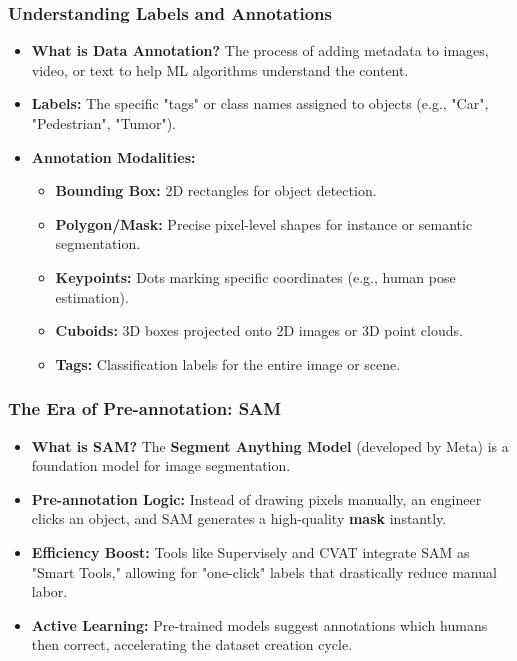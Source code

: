 \documentclass[aspectratio=169]{beamer}
\begin{document}
\begin{frame}[t]
    \frametitle{Understanding Labels and Annotations}
    \begin{itemize}
        \item \textbf{What is Data Annotation?} The process of adding metadata to images, video, or text to help ML algorithms understand the content.
        \item \textbf{Labels:} The specific "tags" or class names assigned to objects (e.g., "Car", "Pedestrian", "Tumor").
        \item \textbf{Annotation Modalities:}
        \begin{itemize}
            \item \textbf{Bounding Box:} 2D rectangles for object detection.
            \item \textbf{Polygon/Mask:} Precise pixel-level shapes for instance or semantic segmentation.
            \item \textbf{Keypoints:} Dots marking specific coordinates (e.g., human pose estimation).
            \item \textbf{Cuboids:} 3D boxes projected onto 2D images or 3D point clouds.
            \item \textbf{Tags:} Classification labels for the entire image or scene.
        \end{itemize}
    \end{itemize}
\end{frame}

\begin{frame}[t]
    \frametitle{The Era of Pre-annotation: SAM}
    \begin{itemize}
        \item \textbf{What is SAM?} The \textbf{Segment Anything Model} (developed by Meta) is a foundation model for image segmentation.
        \item \textbf{Pre-annotation Logic:} Instead of drawing pixels manually, an engineer clicks an object, and SAM generates a high-quality \textbf{mask} instantly.
        \item \textbf{Efficiency Boost:} Tools like Supervisely and CVAT integrate SAM as "Smart Tools," allowing for "one-click" labels that drastically reduce manual labor.
        \item \textbf{Active Learning:} Pre-trained models suggest annotations which humans then correct, accelerating the dataset creation cycle.
    \end{itemize}
\end{frame}
\end{document}
